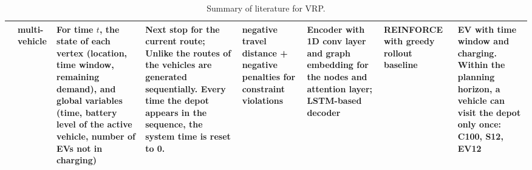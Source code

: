 \documentclass{article}
\newcommand{\tq}[1]{\textcolor{red}{#1}}
\begin{document}
\begin{table}
\begin{tabular}{||p{}|p{}|p{}|p{}|p{}|p{}|p{}|p{}||}
\hline
\cite{lin2021deep} & multi-vehicle & For time $t$, the state of each vertex (location, time window, remaining demand), and global variables (time, battery level of the active vehicle, number of EVs not in charging) & Next stop for the current route; 
Unlike \citep{james2019online} the routes of the vehicles are generated sequentially. Every time the depot appears in the sequence, the system time is reset to 0. & negative travel distance + negative penalties for constraint violations & Encoder with 1D conv layer and graph embedding for the nodes and attention layer; LSTM-based decoder & REINFORCE with greedy rollout baseline \citep{kool2018attention} & EV with time window and charging.
Within the planning horizon, a vehicle can visit the depot only once: C100, S12, EV12 \\
\hline
\hline
\end{tabular}
\caption{Summary of literature for VRP.}
\label{tab:ref_vrp}
\end{table}



 
\end{document}
